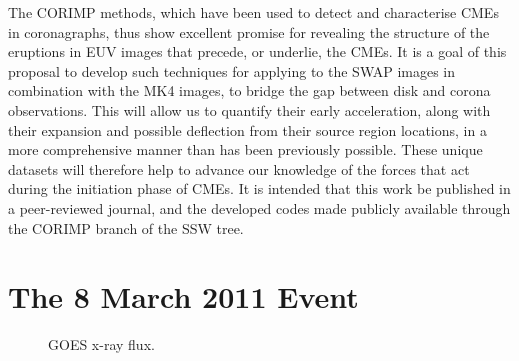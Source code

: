 \documentclass[preprint2]{aastex}
\begin{document}
The CORIMP methods, which have been used to detect and characterise CMEs in coronagraphs, thus show excellent promise for revealing the structure of the eruptions in EUV images that precede, or underlie, the CMEs. It is a goal of this proposal to develop such techniques for applying to the SWAP images in combination with the MK4 images, to bridge the gap between disk and corona observations. This will allow us to quantify their early acceleration, along with their expansion and possible deflection from their source region locations, in a more comprehensive manner than has been previously possible. These unique datasets will therefore help to advance our knowledge of the forces that act during the initiation phase of CMEs. It is intended that this work be published in a peer-reviewed journal, and the developed codes made publicly available through the CORIMP branch of the SSW tree.


\section{The 8 March 2011 Event}

\begin{figure}[!t]
\caption{GOES x-ray flux.}
\label{xrayflux}
\end{figure}
\end{document}

